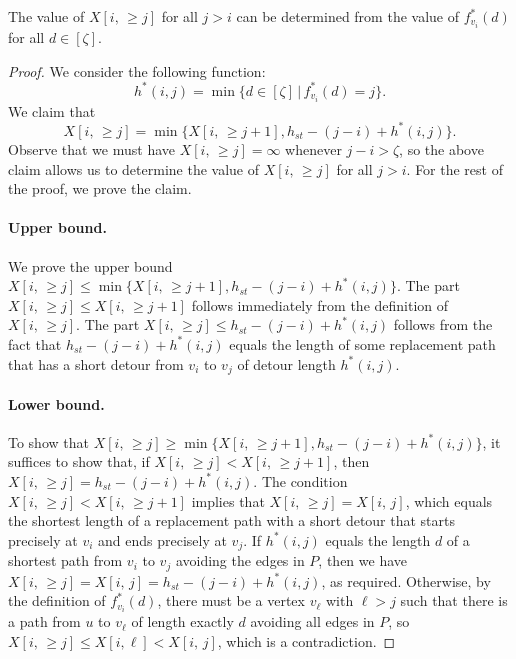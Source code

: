 \begin{lemma}\label{lem:short_base}
The value of $X[i, \, \geq j]$ for all $j > i$ can be determined from the value of $f_{v_i}^\ast(d)$ for all $d \in [\zeta]$.
\end{lemma}
\begin{proof}
We consider the following function:
\[
h^\ast(i,j) = \min\{ d\in[\zeta] \, | \, f_{v_i}^\ast(d)=j\}.
\]
We claim that
\[
X[i, \, \geq j]=\min\{X[i, \, \geq j+1], h_{st}-(j-i)+h^\ast(i,j)\}.\]
Observe that we must have $X[i, \, \geq j] = \infty$ whenever $j-i > \zeta$, so the above claim allows us to determine the value of $X[i, \, \geq j]$ for all $j > i$. For the rest of the proof, we prove the claim. 

\paragraph{Upper bound.} We prove the upper bound $X[i, \, \geq j] \leq \min\{X[i, \, \geq j+1], h_{st}-(j-i)+h^\ast(i,j)\}$. The part $X[i, \, \geq j] \leq X[i, \, \geq j+1]$ follows immediately from the definition of $X[i, \, \geq j]$. The part $X[i, \, \geq j] \leq h_{st}-(j-i)+h^\ast(i,j)$ follows from the fact that $h_{st}-(j-i)+h^\ast(i,j)$ equals the length of some replacement path that has a short detour from $v_i$ to $v_j$ of detour length $h^\ast(i,j)$.

\paragraph{Lower bound.} To show that  $X[i, \, \geq j] \geq \min\{X[i, \, \geq j+1], h_{st}-(j-i)+h^\ast(i,j)\}$, it suffices to show that, if $X[i, \, \geq j] < X[i, \, \geq j+1]$, then $X[i, \, \geq j] = h_{st}-(j-i)+h^\ast(i,j)$. The condition $X[i, \, \geq j] < X[i, \, \geq j+1]$ implies that $X[i, \, \geq j] = X[i, \, j]$, which equals the shortest length of a replacement path with a short detour that starts precisely at $v_i$ and ends precisely at $v_j$. If $h^\ast(i,j)$ equals the length $d$ of a shortest path from $v_i$ to $v_j$ avoiding the edges in $P$, then we have $X[i, \, \geq j] = X[i, \, j] = h_{st}-(j-i)+h^\ast(i,j)$, as required. Otherwise, by the definition of $f^\ast_{v_i}(d)$, there must be a vertex $v_{\ell}$ with $\ell > j$ such that there is a path from $u$ to $v_\ell$  of length exactly $d$ avoiding all edges in $P$, so $X[i, \, \geq j] \leq X[i, \ell] < X[i, \, j]$, which is a contradiction.
\end{proof}


